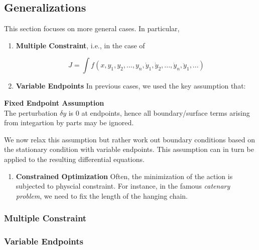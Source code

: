 \subsection{Generalizations}

%
\providecommand{\argmin}{\operatorname*{arg\,min}}%
\providecommand{\argmax}{\operatorname*{arg\,max}}%
This section focuses on more general cases. In particular,

\begin{enumerate}
\item \textbf{Multiple Constraint}, i.e., in the case of

\begin{equation}
J=\int f(x,y_1,y_2,...,y_n,\dot y_1, \dot y_2,...,\dot y_n, \ddot y_1,...)
\end{equation}


\item \textbf{Variable Endpoints}
In previous cases, we used the key assumption that:
\end{enumerate}

\begin{framed}
\textbf{Fixed Endpoint Assumption}\\
The perturbation $\delta y$ is 0 at endpoints, hence all boundary/surface terms arising from integartion by parts may be ignored.
\end{framed}

We now relax this assumption but rather work out boundary conditions based on the stationary condition with variable endpoints. This assumption can in turn be applied to the resulting differential equations.

\begin{enumerate}[resume]
\item \textbf{Constrained Optimization} Often, the minimization of the action is subjected to physcial constraint. For instance, in the famous \textit{catenary problem}, we need to fix the length of the hanging chain.
\end{enumerate}

\subsubsection{Multiple Constraint}

\subsubsection{Variable Endpoints}

